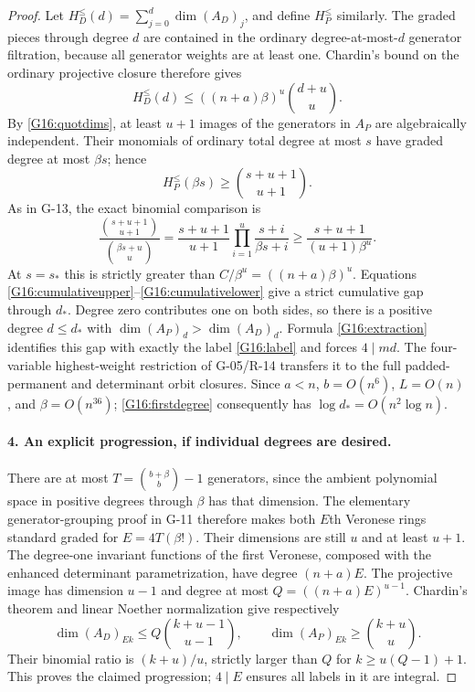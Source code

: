 \documentclass[11pt,a4paper]{article}
\theoremstyle{definition}\newtheorem{definition}{Definition}
\begin{document}
\begin{proof}
Let $H_D^{\leq}(d)=\sum_{j=0}^d\dim(A_D)_j$, and define
$H_P^{\leq}$ similarly. The graded pieces through degree $d$
are contained in the ordinary degree-at-most-$d$ generator filtration,
because all generator weights are at least one. Chardin's bound on
the ordinary projective closure therefore gives
\begin{equation}\label{G16:cumulativeupper}
 H_D^{\leq}(d)\leq((n+a)\beta)^u\binom{d+u}{u}.
\end{equation}
By \eqref{G16:quotdims}, at least $u+1$ images of the generators in
$A_P$ are algebraically independent. Their monomials of ordinary
total degree at most $s$ have graded degree at most $\beta s$;
hence
\begin{equation}\label{G16:cumulativelower}
 H_P^{\leq}(\beta s)\geq\binom{s+u+1}{u+1}.
\end{equation}
As in G-13, the exact binomial comparison is
\[
 \frac{\binom{s+u+1}{u+1}}{\binom{\beta s+u}{u}}
 =\frac{s+u+1}{u+1}\prod_{i=1}^u\frac{s+i}{\beta s+i}
 \geq\frac{s+u+1}{(u+1)\beta^u}.
\]
At $s=s_*$ this is strictly greater than
$C/\beta^u=((n+a)\beta)^u$. Equations
\eqref{G16:cumulativeupper}--\eqref{G16:cumulativelower} give a
strict cumulative gap through $d_*$. Degree zero contributes one
on both sides, so there is a positive degree $d\leq d_*$ with
$\dim(A_P)_d>\dim(A_D)_d$.
Formula \eqref{G16:extraction} identifies this gap with exactly the
label \eqref{G16:label} and forces $4\mid md$.
The four-variable highest-weight restriction of G-05/R-14 transfers
it to the full padded-permanent and determinant orbit closures.
Since $a<n$, $b=O(n^6)$, $L=O(n)$, and $\beta=O(n^{36})$;
\eqref{G16:firstdegree} consequently has
$\log d_*=O(n^2\log n)$.

\paragraph{4. An explicit progression, if individual degrees are desired.}
There are at most $T=\binom{b+\beta}{b}-1$ generators, since the
ambient polynomial space in positive degrees through $\beta$ has
that dimension. The elementary generator-grouping proof in G-11
therefore makes both $E$th Veronese rings standard graded for
$E=4T(\beta!)$. Their dimensions are still $u$ and at least $u+1$.
The degree-one invariant functions of the first Veronese, composed
with the enhanced determinant parametrization, have degree
$(n+a)E$. The projective image has dimension $u-1$ and degree at
most $Q=((n+a)E)^{u-1}$.
Chardin's theorem and linear Noether normalization give respectively
\[
 \dim(A_D)_{Ek}\leq Q\binom{k+u-1}{u-1},\qquad
 \dim(A_P)_{Ek}\geq\binom{k+u}{u}.
\]
Their binomial ratio is $(k+u)/u$, strictly larger than $Q$ for
$k\geq u(Q-1)+1$. This proves the claimed progression; $4\mid E$
ensures all labels in it are integral.
\end{proof}
\end{document}
